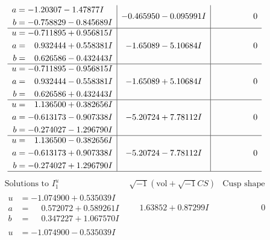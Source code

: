 \documentclass[1p]{elsarticle_modified}
\theoremstyle{definition}
\newcommand{\I}{\sqrt{-1}}
\begin{document}
$$\begin{array}{c|c|c}
\begin{aligned}
a &= -1.20307 - 1.47877 I \\
b &= -0.758829 - 0.845689 I\end{aligned}
 & -0.465950 - 0.095991 I & \phantom{-0.000000 } 0 \\ \hline\begin{aligned}
u &= -0.711895 + 0.956815 I \\
a &= \phantom{-}0.932444 + 0.558381 I \\
b &= \phantom{-}0.626586 - 0.432443 I\end{aligned}
 & -1.65089 - 5.10684 I & \phantom{-0.000000 } 0 \\ \hline\begin{aligned}
u &= -0.711895 - 0.956815 I \\
a &= \phantom{-}0.932444 - 0.558381 I \\
b &= \phantom{-}0.626586 + 0.432443 I\end{aligned}
 & -1.65089 + 5.10684 I & \phantom{-0.000000 } 0 \\ \hline\begin{aligned}
u &= \phantom{-}1.136500 + 0.382656 I \\
a &= -0.613173 - 0.907338 I \\
b &= -0.274027 - 1.296790 I\end{aligned}
 & -5.20724 + 7.78112 I & \phantom{-0.000000 } 0 \\ \hline\begin{aligned}
u &= \phantom{-}1.136500 - 0.382656 I \\
a &= -0.613173 + 0.907338 I \\
b &= -0.274027 + 1.296790 I\end{aligned}
 & -5.20724 - 7.78112 I & \phantom{-0.000000 } 0\\
 \hline 
 \end{array}$$\newpage$$\begin{array}{c|c|c}  
\text{Solutions to }I^u_{1}& \I (\text{vol} + \sqrt{-1}CS) & \text{Cusp shape}\\
 \hline 
\begin{aligned}
u &= -1.074900 + 0.535039 I \\
a &= \phantom{-}0.572072 + 0.589261 I \\
b &= \phantom{-}0.347227 + 1.067570 I\end{aligned}
 & \phantom{-}1.63852 + 0.87299 I & \phantom{-0.000000 } 0 \\ \hline\begin{aligned}
u &= -1.074900 - 0.535039 I \\

\end{aligned}
\end{array}$$
\end{document}
